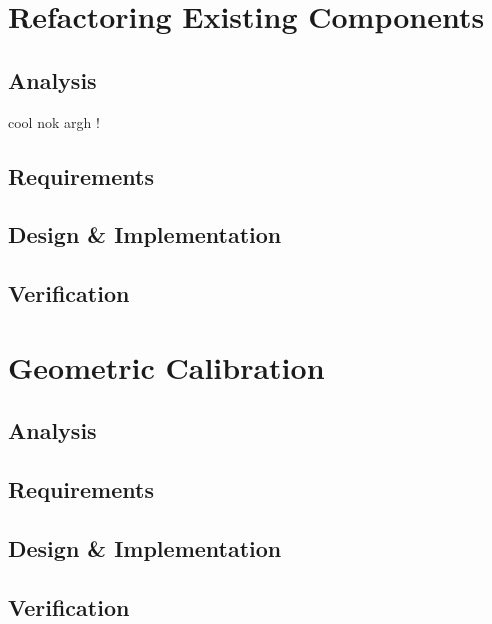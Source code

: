 \chapter{Refactoring Existing Components}
\section{Analysis}
cool nok
argh !
\section{Requirements}
\section{Design \& Implementation}
\section{Verification}

\chapter{Geometric Calibration}
\section{Analysis}
\section{Requirements}
\section{Design \& Implementation}
\section{Verification}

